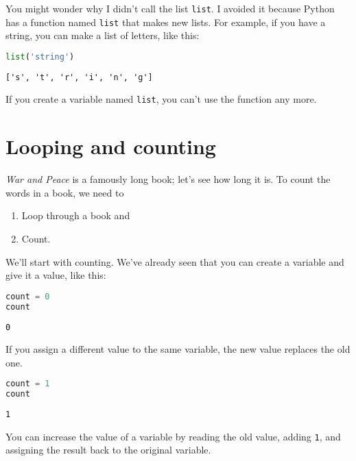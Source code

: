 You might wonder why I didn't call the list
\passthrough{\lstinline!list!}. I avoided it because Python has a
function named \passthrough{\lstinline!list!} that makes new lists. For
example, if you have a string, you can make a list of letters, like
this:

\begin{lstlisting}[language=Python]
list('string')
\end{lstlisting}

\begin{lstlisting}[]
['s', 't', 'r', 'i', 'n', 'g']
\end{lstlisting}

If you create a variable named \passthrough{\lstinline!list!}, you can't
use the function any more.

\hypertarget{looping-and-counting}{%
\section{Looping and counting}\label{looping-and-counting}}

\emph{War and Peace} is a famously long book; let's see how long it is.
To count the words in a book, we need to

\begin{enumerate}
\def\labelenumi{\arabic{enumi}.}
\item
  Loop through a book and
\item
  Count.
\end{enumerate}

We'll start with counting. We've already seen that you can create a
variable and give it a value, like this:

\begin{lstlisting}[language=Python]
count = 0
count
\end{lstlisting}

\begin{lstlisting}[]
0
\end{lstlisting}

If you assign a different value to the same variable, the new value
replaces the old one.

\begin{lstlisting}[language=Python]
count = 1
count
\end{lstlisting}

\begin{lstlisting}[]
1
\end{lstlisting}

You can increase the value of a variable by reading the old value,
adding \passthrough{\lstinline!1!}, and assigning the result back to the
original variable.

